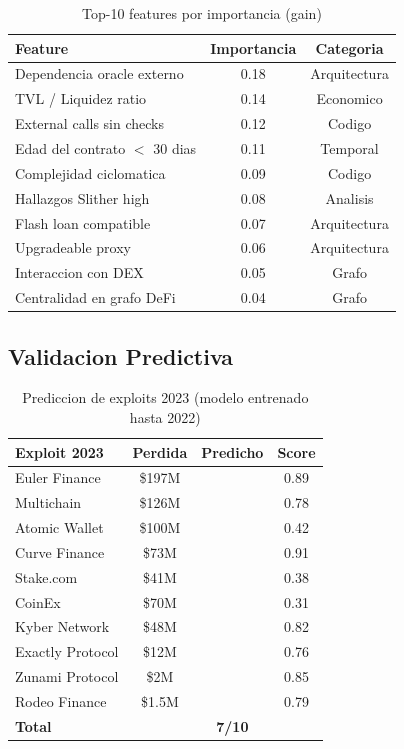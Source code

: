 \documentclass[11pt]{article}
\newcommand{\cmark}{\ding{51}}
\newcommand{\xmark}{\ding{55}}
\theoremstyle{definition}
\theoremstyle{plain}
\theoremstyle{remark}
\begin{document}
\begin{table}[H]
\centering
\caption{Top-10 features por importancia (gain)}
\label{tab:feature_importance}
\begin{tabular}{lcc}
\toprule
\textbf{Feature} & \textbf{Importancia} & \textbf{Categoria} \\
\midrule
Dependencia oracle externo & 0.18 & Arquitectura \\
TVL / Liquidez ratio & 0.14 & Economico \\
External calls sin checks & 0.12 & Codigo \\
Edad del contrato $<$ 30 dias & 0.11 & Temporal \\
Complejidad ciclomatica & 0.09 & Codigo \\
Hallazgos Slither high & 0.08 & Analisis \\
Flash loan compatible & 0.07 & Arquitectura \\
Upgradeable proxy & 0.06 & Arquitectura \\
Interaccion con DEX & 0.05 & Grafo \\
Centralidad en grafo DeFi & 0.04 & Grafo \\
\bottomrule
\end{tabular}
\end{table}

\subsection{Validacion Predictiva}

\begin{table}[H]
\centering
\caption{Prediccion de exploits 2023 (modelo entrenado hasta 2022)}
\label{tab:prediction_2023}
\begin{tabular}{lccc}
\toprule
\textbf{Exploit 2023} & \textbf{Perdida} & \textbf{Predicho} & \textbf{Score} \\
\midrule
Euler Finance & \$197M & \cmark & 0.89 \\
Multichain & \$126M & \cmark & 0.78 \\
Atomic Wallet & \$100M & \xmark & 0.42 \\
Curve Finance & \$73M & \cmark & 0.91 \\
Stake.com & \$41M & \xmark & 0.38 \\
CoinEx & \$70M & \xmark & 0.31 \\
Kyber Network & \$48M & \cmark & 0.82 \\
Exactly Protocol & \$12M & \cmark & 0.76 \\
Zunami Protocol & \$2M & \cmark & 0.85 \\
Rodeo Finance & \$1.5M & \cmark & 0.79 \\
\midrule
\textbf{Total} & & \textbf{7/10} & \\
\bottomrule
\end{tabular}
\end{table}
\end{document}
